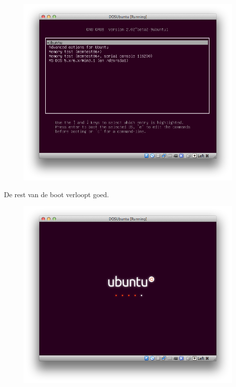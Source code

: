 \documentclass[11pt, a4paper]{article}
\begin{document}
\begin{figure}[H]
	\centering
	\includegraphics[width=\textwidth]{./IMG/V}
\end{figure}

De rest van de boot verloopt goed.

\begin{figure}[H]
	\centering
	\includegraphics[width=\textwidth]{./IMG/W}
\end{figure}
\end{document}
